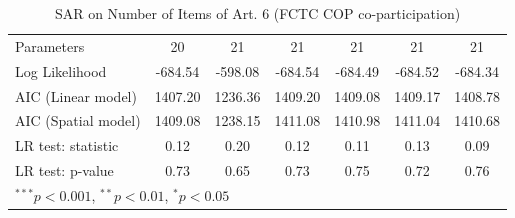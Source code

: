 \begin{table}[!h]
\begin{center}
\begin{tabular}{l c c c c c c }
Parameters              & 20           & 21           & 21           & 21           & 21           & 21           \\
Log Likelihood          & -684.54      & -598.08      & -684.54      & -684.49      & -684.52      & -684.34      \\
AIC (Linear model)      & 1407.20      & 1236.36      & 1409.20      & 1409.08      & 1409.17      & 1408.78      \\
AIC (Spatial model)     & 1409.08      & 1238.15      & 1411.08      & 1410.98      & 1411.04      & 1410.68      \\
LR test: statistic      & 0.12         & 0.20         & 0.12         & 0.11         & 0.13         & 0.09         \\
LR test: p-value        & 0.73         & 0.65         & 0.73         & 0.75         & 0.72         & 0.76         \\
\bottomrule
\multicolumn{7}{l}{\scriptsize{$^{***}p<0.001$, $^{**}p<0.01$, $^*p<0.05$}}
\end{tabular}
\caption{SAR on Number of Items of Art. 6 (FCTC COP co-participation)}
\label{table:coefficients}
\end{center}
\end{table}
